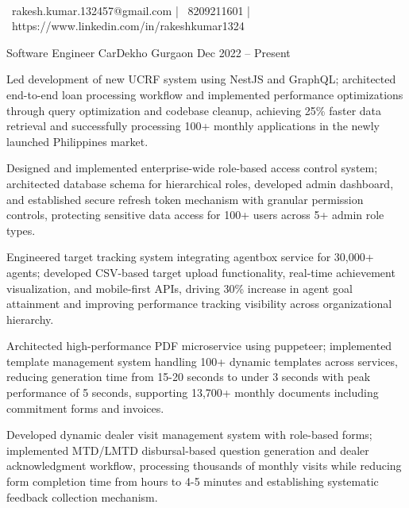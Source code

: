 \documentclass[]{awesome-cv}
\begin{document}
    
\begin{center}
	  \\
	\vspace{2mm}
	{\faEnvelope\ rakesh.kumar.132457@gmail.com} | {\faMobile\ 8209211601} | {\faLink\ https://www.linkedin.com/in/rakeshkumar1324}
\end{center}
\begin{cventries}
	\cventry
	{Software Engineer}
	{CarDekho}
	{Gurgaon}
	{Dec 2022 – Present}
	{\begin{cvitems}
		\item {Led development of new UCRF system using NestJS and GraphQL; architected end-to-end loan processing workflow and implemented performance optimizations through query optimization and codebase cleanup, achieving 25\% faster data retrieval and successfully processing 100+ monthly applications in the newly launched Philippines market.}
		\item {Designed and implemented enterprise-wide role-based access control system; architected database schema for hierarchical roles, developed admin dashboard, and established secure refresh token mechanism with granular permission controls, protecting sensitive data access for 100+ users across 5+ admin role types.}
		\item {Engineered target tracking system integrating agentbox service for 30,000+ agents; developed CSV-based target upload functionality, real-time achievement visualization, and mobile-first APIs, driving 30\% increase in agent goal attainment and improving performance tracking visibility across organizational hierarchy.}
		\item {Architected high-performance PDF microservice using puppeteer; implemented template management system handling 100+ dynamic templates across services, reducing generation time from 15-20 seconds to under 3 seconds with peak performance of 5 seconds, supporting 13,700+ monthly documents including commitment forms and invoices.}
		\item {Developed dynamic dealer visit management system with role-based forms; implemented MTD/LMTD disbursal-based question generation and dealer acknowledgment workflow, processing thousands of monthly visits while reducing form completion time from hours to 4-5 minutes and establishing systematic feedback collection mechanism.}

\end{cvitems}}
\end{cventries}
\end{document}
